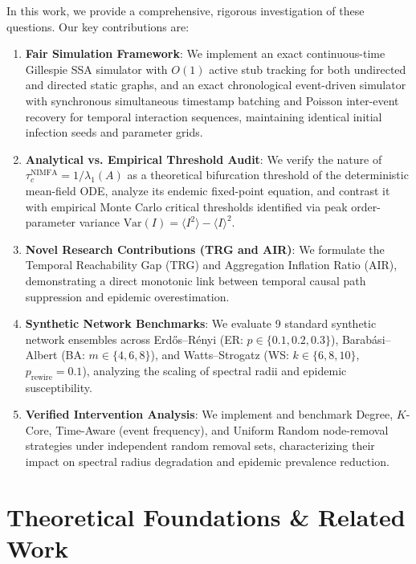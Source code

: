 \documentclass[conference]{IEEEtran}
\begin{document}
In this work, we provide a comprehensive, rigorous investigation of these questions. Our key contributions are:
\begin{enumerate}
    \item \textbf{Fair Simulation Framework}: We implement an exact continuous-time Gillespie SSA simulator with $O(1)$ active stub tracking for both undirected and directed static graphs, and an exact chronological event-driven simulator with synchronous simultaneous timestamp batching and Poisson inter-event recovery for temporal interaction sequences, maintaining identical initial infection seeds and parameter grids.
    \item \textbf{Analytical vs. Empirical Threshold Audit}: We verify the nature of $\tau_c^{\text{NIMFA}} = 1/\lambda_1(A)$ as a theoretical bifurcation threshold of the deterministic mean-field ODE, analyze its endemic fixed-point equation, and contrast it with empirical Monte Carlo critical thresholds identified via peak order-parameter variance $\text{Var}(I) = \langle I^2 \rangle - \langle I \rangle^2$.
    \item \textbf{Novel Research Contributions (TRG and AIR)}: We formulate the Temporal Reachability Gap (TRG) and Aggregation Inflation Ratio (AIR), demonstrating a direct monotonic link between temporal causal path suppression and epidemic overestimation.
    \item \textbf{Synthetic Network Benchmarks}: We evaluate 9 standard synthetic network ensembles across Erd\H{o}s--R\'enyi (ER: $p \in \{0.1, 0.2, 0.3\}$), Barab\'asi--Albert (BA: $m \in \{4, 6, 8\}$), and Watts--Strogatz (WS: $k \in \{6, 8, 10\}$, $p_{\text{rewire}} = 0.1$), analyzing the scaling of spectral radii and epidemic susceptibility.
    \item \textbf{Verified Intervention Analysis}: We implement and benchmark Degree, $K$-Core, Time-Aware (event frequency), and Uniform Random node-removal strategies under independent random removal sets, characterizing their impact on spectral radius degradation and epidemic prevalence reduction.
\end{enumerate}

\section{Theoretical Foundations \& Related Work}
\end{document}

